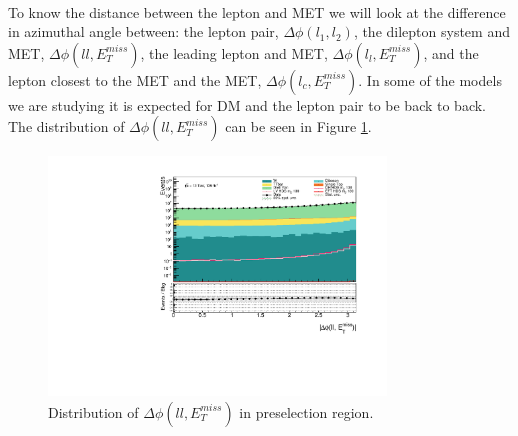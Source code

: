 \documentclass[12pt, a4paper]{book}
\begin{document}
\graphicspath{{../../../Plots/Data_Analysis/SRs/Control_region/}} 
\\To know the distance between the lepton and MET we will look at the difference in azimuthal angle between: the lepton pair, $\Delta\phi(l_1,l_2)$, the dilepton system and MET, $\Delta\phi(ll,E_T^{miss})$, the leading lepton and MET, $\Delta\phi(l_l,E_T^{miss})$, 
and the lepton closest to the MET and the MET, $\Delta\phi(l_c,E_T^{miss})$. In some of the models we are studying it is expected for DM and the lepton pair to be back to back. The distribution of $\Delta\phi(ll,E_T^{miss})$ can be seen in Figure \ref{fig:dPhiLLMET_dist}.
\begin{figure}[!ht]
    \centering
        \includegraphics[width=0.8\textwidth]{dPhiLLMET.pdf}
    \caption{Distribution of $\Delta\phi(ll,E_T^{miss})$ in preselection region.}\label{fig:dPhiLLMET_dist}
\end{figure}
\end{document}
